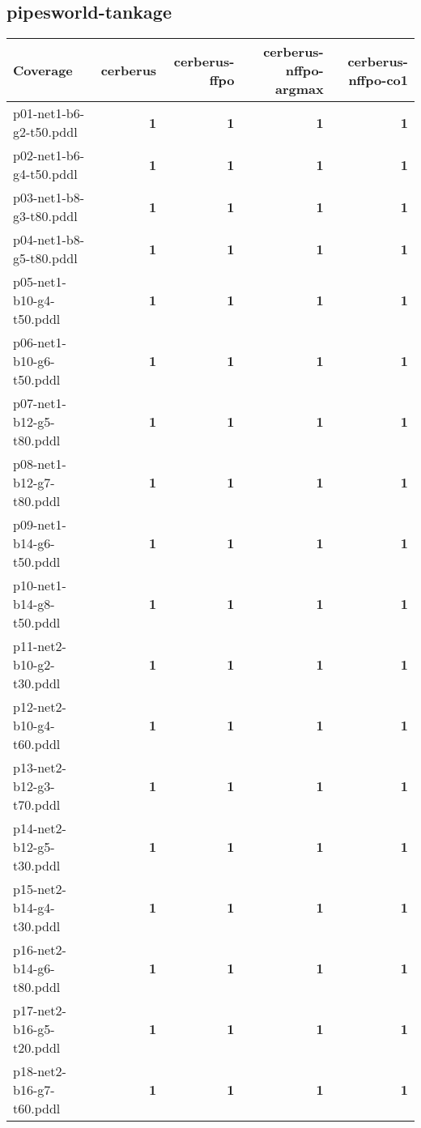 \documentclass{article}
\begin{document}
\hypertarget{coverage-pipesworld-tankage}{}
\subsection*{pipesworld-tankage}

\begin{tabular}{@{}lrrrr@{}}
Coverage & cerberus & cerberus-ffpo & cerberus-nffpo-argmax & cerberus-nffpo-co1 \\
\midrule
p01-net1-b6-g2-t50.pddl & \textbf{1} & \textbf{1} & \textbf{1} & \textbf{1} \\
p02-net1-b6-g4-t50.pddl & \textbf{1} & \textbf{1} & \textbf{1} & \textbf{1} \\
p03-net1-b8-g3-t80.pddl & \textbf{1} & \textbf{1} & \textbf{1} & \textbf{1} \\
p04-net1-b8-g5-t80.pddl & \textbf{1} & \textbf{1} & \textbf{1} & \textbf{1} \\
p05-net1-b10-g4-t50.pddl & \textbf{1} & \textbf{1} & \textbf{1} & \textbf{1} \\
p06-net1-b10-g6-t50.pddl & \textbf{1} & \textbf{1} & \textbf{1} & \textbf{1} \\
p07-net1-b12-g5-t80.pddl & \textbf{1} & \textbf{1} & \textbf{1} & \textbf{1} \\
p08-net1-b12-g7-t80.pddl & \textbf{1} & \textbf{1} & \textbf{1} & \textbf{1} \\
p09-net1-b14-g6-t50.pddl & \textbf{1} & \textbf{1} & \textbf{1} & \textbf{1} \\
p10-net1-b14-g8-t50.pddl & \textbf{1} & \textbf{1} & \textbf{1} & \textbf{1} \\
p11-net2-b10-g2-t30.pddl & \textbf{1} & \textbf{1} & \textbf{1} & \textbf{1} \\
p12-net2-b10-g4-t60.pddl & \textbf{1} & \textbf{1} & \textbf{1} & \textbf{1} \\
p13-net2-b12-g3-t70.pddl & \textbf{1} & \textbf{1} & \textbf{1} & \textbf{1} \\
p14-net2-b12-g5-t30.pddl & \textbf{1} & \textbf{1} & \textbf{1} & \textbf{1} \\
p15-net2-b14-g4-t30.pddl & \textbf{1} & \textbf{1} & \textbf{1} & \textbf{1} \\
p16-net2-b14-g6-t80.pddl & \textbf{1} & \textbf{1} & \textbf{1} & \textbf{1} \\
p17-net2-b16-g5-t20.pddl & \textbf{1} & \textbf{1} & \textbf{1} & \textbf{1} \\
p18-net2-b16-g7-t60.pddl & \textbf{1} & \textbf{1} & \textbf{1} & \textbf{1} \\

\end{tabular}
\end{document}
